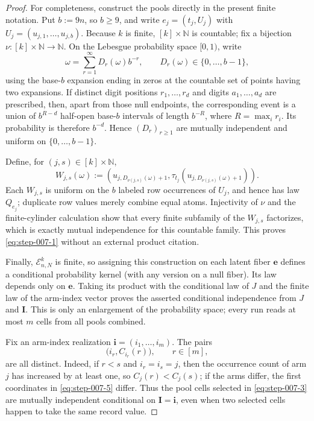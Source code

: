 \begin{proof}

For completeness, construct the pools directly in the present finite
notation.  Put \(b:=9n\), so \(b\geq9\), and write
\(e_j=(t_j,U_j)\) with
\(U_j=(u_{j,1},\ldots,u_{j,b})\).  Because \(k\) is finite,
\([k]\times\mathbb N\) is countable; fix a bijection
\(\nu:[k]\times\mathbb N\to\mathbb N\).  On the Lebesgue probability
space \([0,1)\), write
\[
\omega=\sum_{r=1}^{\infty}D_r(\omega)b^{-r},
\qquad D_r(\omega)\in\{0,\ldots,b-1\},
\]
using the base-\(b\) expansion ending in zeros at the countable set of
points having two expansions.  If distinct digit positions
\(r_1,\ldots,r_d\) and digits \(a_1,\ldots,a_d\) are prescribed, then,
apart from those null endpoints, the corresponding event is a union of
\(b^{R-d}\) half-open base-\(b\) intervals of length \(b^{-R}\), where
\(R=\max_i r_i\).  Its probability is therefore \(b^{-d}\).  Hence
\((D_r)_{r\geq1}\) are mutually independent and uniform on
\(\{0,\ldots,b-1\}\).

Define, for \((j,s)\in[k]\times\mathbb N\),
\[
W_{j,s}(\omega)
:=\left(
u_{j,D_{\nu(j,s)}(\omega)+1},
\tau_{t_j}\!\left(u_{j,D_{\nu(j,s)}(\omega)+1}\right)
\right).
\]
Each \(W_{j,s}\) is uniform on the \(b\) labeled row occurrences of
\(U_j\), and hence has law \(Q_{e_j}\); duplicate row values merely
combine equal atoms.  Injectivity of \(\nu\) and the finite-cylinder
calculation show that every finite subfamily of the \(W_{j,s}\)
factorizes, which is exactly mutual independence for this countable
family.  This proves \eqref{eq:step-007-1} without an external product
citation.

Finally, \(\mathcal E_{n,N}^k\) is finite, so assigning this construction
on each latent fiber \(\mathbf e\) defines a conditional probability
kernel (with any version on a null fiber).  Its law depends only on
\(\mathbf e\).  Taking its product with the conditional law of \(J\)
and the finite law of the arm-index vector proves the asserted
conditional independence from \(J\) and \(\mathbf I\).  This is only
an enlargement of the probability space; every run reads at most \(m\)
cells from all pools combined.

Fix an arm-index realization
\(\mathbf i=(i_1,\ldots,i_m)\).  The pairs
\[
\bigl(i_r,C_{i_r}(r)\bigr),\qquad r\in[m],
\tag{5}\label{eq:step-007-5}
\]
are all distinct.  Indeed, if \(r<s\) and \(i_r=i_s=j\), then the
occurrence count of arm \(j\) has increased by at least one, so
\(C_j(r)<C_j(s)\); if the arms differ, the first coordinates in \eqref{eq:step-007-5}
differ.  Thus the pool cells selected in \eqref{eq:step-007-3} are mutually independent
conditional on \(\mathbf I=\mathbf i\), even when two selected cells
happen to take the same record value.


\end{proof}
